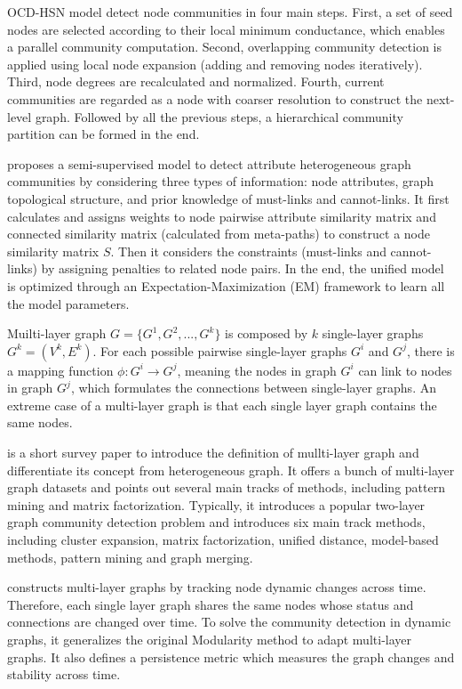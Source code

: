 OCD-HSN model \cite{huang2018overlapping} detect node communities in four main steps. First, a set of seed nodes are selected according to their local minimum conductance, which enables a parallel community computation. Second, overlapping community detection is applied using local node expansion (adding and removing nodes iteratively). Third, node degrees are recalculated and normalized. Fourth, current communities are regarded as a node with coarser resolution to construct the next-level graph. Followed by all the previous steps, a hierarchical community partition can be formed in the end. 

 \cite{li2017semi} proposes a semi-supervised model to detect attribute heterogeneous graph communities by considering three types of information: node attributes, graph topological structure, and prior knowledge of must-links and cannot-links. It first calculates and assigns weights to node pairwise attribute similarity matrix and connected similarity matrix (calculated from meta-paths) to construct a node similarity matrix $S$. Then it considers the constraints (must-links and cannot-links) by assigning penalties to related node pairs. In the end, the unified model is optimized through an Expectation-Maximization (EM) framework to learn all the model parameters. 

Muilti-layer graph $G=\{G^1,G^2,...,G^k\}$ is composed by $k$ single-layer graphs $G^k= (V^k,E^k)$. For each possible pairwise single-layer graphs $G^i$ and $G^j$, there is a mapping function $\phi : G^i \rightarrow G^j$, meaning the nodes in graph $G^i$ can link to nodes in graph $G^j$, which formulates the connections between single-layer graphs. An extreme case of a multi-layer graph is that each single layer graph contains the same nodes.

\cite{kim2015community} is a short survey paper to introduce the definition of mullti-layer graph and differentiate its concept from heterogeneous graph. It offers a bunch of multi-layer graph datasets and points out several main tracks of methods, including pattern mining and matrix factorization. Typically, it introduces a popular two-layer graph community detection problem and introduces six main track methods, including cluster expansion, matrix factorization, unified distance, model-based methods, pattern mining and graph merging. 

\cite{bazzi2016community} constructs multi-layer graphs by tracking node dynamic changes across time. Therefore, each single layer graph shares the same nodes whose status and connections are changed over time. To solve the community detection in dynamic graphs, it generalizes the original Modularity method to adapt multi-layer graphs.  It also defines a persistence metric which measures the graph changes and stability across time.  

